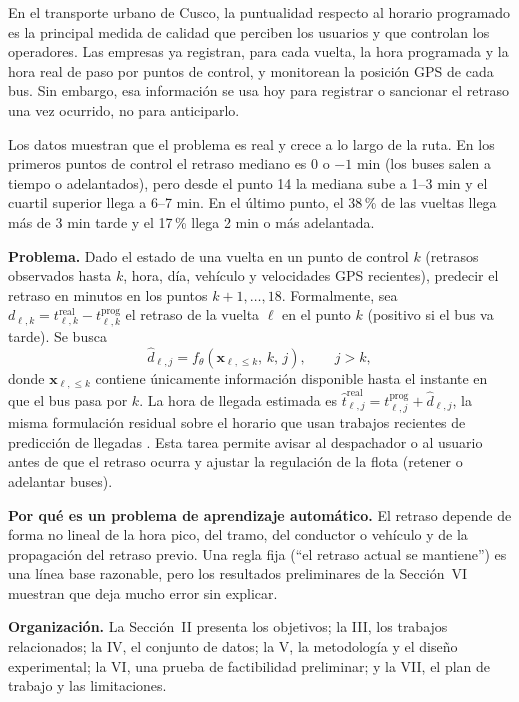 \documentclass[conference,spanish]{IEEEtran}
\begin{document}
En el transporte urbano de Cusco, la puntualidad respecto al horario programado es la principal medida de calidad que perciben los usuarios y que controlan los operadores. Las empresas ya registran, para cada vuelta, la hora programada y la hora real de paso por puntos de control, y monitorean la posición GPS de cada bus. Sin embargo, esa información se usa hoy para registrar o sancionar el retraso una vez ocurrido, no para anticiparlo.

Los datos muestran que el problema es real y crece a lo largo de la ruta. En los primeros puntos de control el retraso mediano es 0 o $-1$ min (los buses salen a tiempo o adelantados), pero desde el punto 14 la mediana sube a 1--3 min y el cuartil superior llega a 6--7 min. En el último punto, el 38\,\% de las vueltas llega más de 3 min tarde y el 17\,\% llega 2 min o más adelantada.

\textbf{Problema.} Dado el estado de una vuelta en un punto de control $k$ (retrasos observados hasta $k$, hora, día, vehículo y velocidades GPS recientes), predecir el retraso en minutos en los puntos $k{+}1,\dots,18$. Formalmente, sea $d_{\ell,k}=t^{\mathrm{real}}_{\ell,k}-t^{\mathrm{prog}}_{\ell,k}$ el retraso de la vuelta $\ell$ en el punto $k$ (positivo si el bus va tarde). Se busca
\begin{equation}
\hat d_{\ell,j}=f_\theta\!\left(\mathbf x_{\ell,\le k},\, k,\, j\right),\qquad j>k,
\end{equation}
donde $\mathbf x_{\ell,\le k}$ contiene únicamente información disponible hasta el instante en que el bus pasa por $k$. La hora de llegada estimada es $\hat t^{\mathrm{real}}_{\ell,j}=t^{\mathrm{prog}}_{\ell,j}+\hat d_{\ell,j}$, la misma formulación residual sobre el horario que usan trabajos recientes de predicción de llegadas \cite{li2024arrivalnet,hu2022deepreta}. Esta tarea permite avisar al despachador o al usuario antes de que el retraso ocurra y ajustar la regulación de la flota (retener o adelantar buses).

\textbf{Por qué es un problema de aprendizaje automático.} El retraso depende de forma no lineal de la hora pico, del tramo, del conductor o vehículo y de la propagación del retraso previo. Una regla fija (``el retraso actual se mantiene'') es una línea base razonable, pero los resultados preliminares de la Sección~VI muestran que deja mucho error sin explicar.

\textbf{Organización.} La Sección~II presenta los objetivos; la III, los trabajos relacionados; la IV, el conjunto de datos; la V, la metodología y el diseño experimental; la VI, una prueba de factibilidad preliminar; y la VII, el plan de trabajo y las limitaciones.
\end{document}
